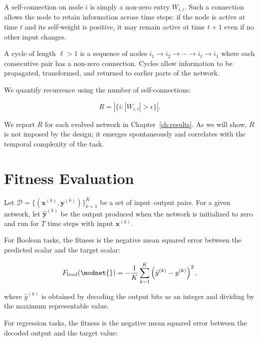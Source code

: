 A self-connection on node $i$ is simply a non-zero entry $W_{i,i}$.
Such a connection allows the node to retain information across time
steps: if the node is active at time $t$ and its self-weight is
positive, it may remain active at time $t+1$ even if no other input
changes.

A cycle of length $\ell > 1$ is a sequence of nodes
$i_1 \to i_2 \to \cdots \to i_\ell \to i_1$ where each consecutive
pair has a non-zero connection. Cycles allow information to be
propagated, transformed, and returned to earlier parts of the network.

We quantify recurrence using the number of self-connections:

\begin{equation}
  R = \left| \{i : |W_{i,i}| > \epsilon\} \right|.
  \label{eq:recurrence-metric}
\end{equation}

We report $R$ for each evolved network in Chapter~\ref{ch:results}.
As we will show, $R$ is not imposed by the design; it emerges
spontaneously and correlates with the temporal complexity of the task.

\section{Fitness Evaluation}
\label{sec:fitness}

Let $\mathcal{D} = \{(\mathbf{x}^{(k)}, \mathbf{y}^{(k)})\}_{k=1}^{K}$
be a set of input--output pairs. For a given network, let
$\hat{\mathbf{y}}^{(k)}$ be the output produced when the network is
initialized to zero and run for $T$ time steps with input
$\mathbf{x}^{(k)}$.

For Boolean tasks, the fitness is the negative mean squared error
between the predicted scalar and the target scalar:

\begin{equation}
  F_{\text{bool}}(\modnet{}) = -\frac{1}{K} \sum_{k=1}^{K}
    \left( \hat{y}^{(k)} - y^{(k)} \right)^2,
  \label{eq:fitness-boolean}
\end{equation}

where $\hat{y}^{(k)}$ is obtained by decoding the output bits as an
integer and dividing by the maximum representable value.

For regression tasks, the fitness is the negative mean squared error
between the decoded output and the target value:

